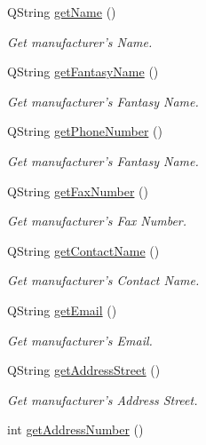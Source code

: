 \begin{DoxyCompactItemize}
\-Q\-String \hyperlink{class_manufacturer_a39c7e0148e16ecdcfe8e93b0eb3d7483}{get\-Name} ()
\begin{DoxyCompactList}\small\item\em \-Get manufacturer's \-Name. \end{DoxyCompactList}\item 
\-Q\-String \hyperlink{class_manufacturer_aedf3cca11ab26cc4f9223684b970181c}{get\-Fantasy\-Name} ()
\begin{DoxyCompactList}\small\item\em \-Get manufacturer's \-Fantasy \-Name. \end{DoxyCompactList}\item 
\-Q\-String \hyperlink{class_manufacturer_a2b79da5459c9db4c439ac0033753c5c5}{get\-Phone\-Number} ()
\begin{DoxyCompactList}\small\item\em \-Get manufacturer's \-Fantasy \-Name. \end{DoxyCompactList}\item 
\-Q\-String \hyperlink{class_manufacturer_a500ef8ed76914d418b4a43449056f60f}{get\-Fax\-Number} ()
\begin{DoxyCompactList}\small\item\em \-Get manufacturer's \-Fax \-Number. \end{DoxyCompactList}\item 
\-Q\-String \hyperlink{class_manufacturer_a4f981e282b71d181f26b3cd20e8786e8}{get\-Contact\-Name} ()
\begin{DoxyCompactList}\small\item\em \-Get manufacturer's \-Contact \-Name. \end{DoxyCompactList}\item 
\-Q\-String \hyperlink{class_manufacturer_aede8ff98dd6557fc023c446911908ee6}{get\-Email} ()
\begin{DoxyCompactList}\small\item\em \-Get manufacturer's \-Email. \end{DoxyCompactList}\item 
\-Q\-String \hyperlink{class_manufacturer_aa5a0bc498022cd5d8037b6280a1f038f}{get\-Address\-Street} ()
\begin{DoxyCompactList}\small\item\em \-Get manufacturer's \-Address \-Street. \end{DoxyCompactList}\item 
int \hyperlink{class_manufacturer_ab64e45a9eb71640cb77f49350b9b8831}{get\-Address\-Number} ()

\end{DoxyCompactItemize}
